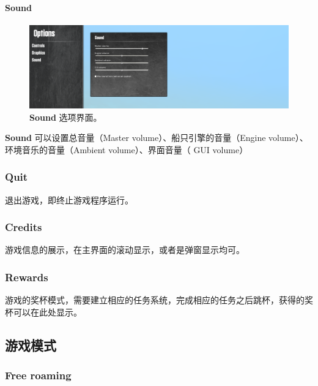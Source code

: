 \documentclass[letterpaper,10pt]{article}
\begin{document}
					\paragraph{Sound}
					
					\begin{figure}[htbp]
						\centering 
						\includegraphics[width=0.7\columnwidth]{picture/Options_Sound}
						\caption{
							\label{fig: Options_Sound} 
							\textbf{Sound} 选项界面。
						}	
					\end{figure}
					
					\textbf{Sound} 可以设置总音量（Master volume）、船只引擎的音量（Engine volume）、环境音乐的音量（Ambient volume）、界面音量（ GUI volume）
				
				\subsubsection{Quit}
				
				退出游戏，即终止游戏程序运行。
				
				\subsubsection{Credits}
				
				游戏信息的展示，在主界面的滚动显示，或者是弹窗显示均可。
				
				\subsubsection{Rewards}
	
				游戏的奖杯模式，需要建立相应的任务系统，完成相应的任务之后跳杯，获得的奖杯可以在此处显示。
	
			\subsection{游戏模式}
	
				\subsubsection{Free roaming}
				
\end{document}

